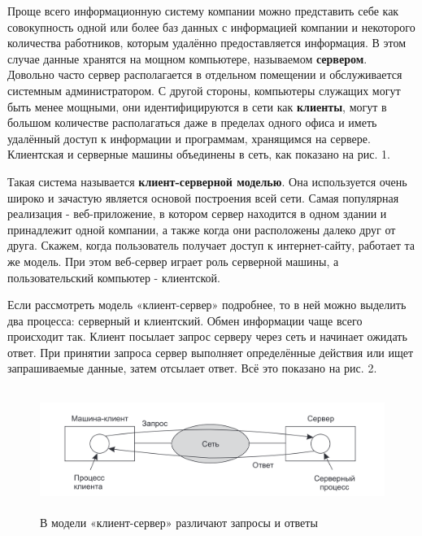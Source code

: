 	\par  Проще всего информационную систему компании можно представить себе как совокупность одной или более баз данных с информацией компании и некоторого количества работников, которым удалённо предоставляется информация. В этом случае 
	данные хранятся на мощном компьютере, называемом \textbf{сервером}. Довольно часто сервер располагается в отдельном помещении и обслуживается системным администратором. С другой стороны, компьютеры служащих могут быть менее мощными, они  идентифицируются в сети как \textbf{клиенты}, могут в большом количестве располагаться даже в пределах одного офиса и иметь удалённый доступ к информации и программам, хранящимся на сервере.  Клиентская и серверные машины объединены в сеть, как показано на рис. 1.
    
    \par Такая система называется \textbf{клиент-серверной моделью}. Она используется очень широко и зачастую является основой построения всей сети. Самая популярная реализация - веб-приложение, в котором сервер находится в одном здании и принадлежит одной компании, а также когда они расположены далеко друг от друга. Скажем, когда пользователь получает доступ к интернет-сайту, работает та же модель. При этом веб-сервер играет роль серверной машины, а пользовательский компьютер - клиентской. 
    
    \par Если рассмотреть модель «клиент-сервер» подробнее, то в ней можно выделить два процесса: серверный и клиентский. Обмен информации чаще всего происходит так. Клиент посылает запрос серверу через сеть и начинает ожидать ответ. При принятии запроса сервер выполняет определённые действия или ищет запрашиваемые данные, затем отсылает ответ. Всё это показано на рис. 2. 
    
    \begin{figure}[h]
    	\centering
    	\includegraphics[height=4cm]{img/1.2} 
    	\captionsetup{font=footnotesize}
    	\caption{В модели «клиент-сервер» различают запросы и ответы} 
    \end{figure}
	
